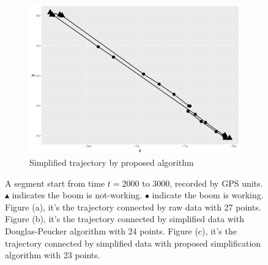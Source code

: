 \begin{figure}[h]
\begin{subfigure}[t]{0.47\textwidth}
\includegraphics[width=\linewidth]{Chapters/06Spinoff/plot/ggSPTrac.pdf}
\caption{Simplified trajectory by proposed algorithm}
\end{subfigure}
\caption{A segment start from time $t=2000$ to $3000$, recorded by GPS units. $\blacktriangle$ indicates the boom is not-working. $\bullet$ indicate the boom is working. Figure (a), it's the trajectory connected by raw data with 27 points. Figure (b), it's the trajectory connected by simplified data with Douglas-Peucker algorithm with 24 points. Figure (c), it's the trajectory connected by simplified data with proposed simplification algorithm with 23  points.}\label{DataSimpRawTra}
\end{figure}

